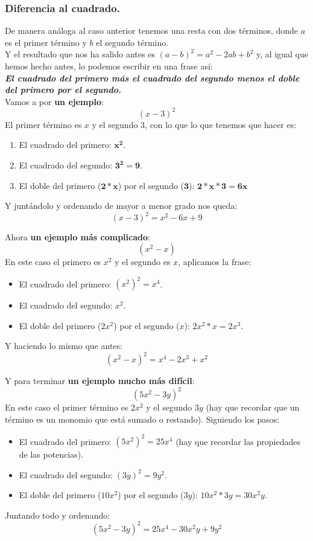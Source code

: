 \documentclass[a4paper,11pt,answers]{exam}
\begin{document}
  \subsubsection{Diferencia al cuadrado.}
  De manera análoga al caso anterior tenemos una resta con dos términos, donde $a$ es el primer término y $b$ el segundo término.\\

  Y el resultado que nos ha salido antes es $(a-b)^2 = a^2 - 2ab + b^2$ y, al igual que hemos hecho antes, lo podemos escribir en una frase así:\\
  \textbf{\emph{El cuadrado del primero más el cuadrado del segundo menos el doble del primero por el segundo.}}\\

  Vamos a por \textbf{un ejemplo}:
  \[(x - 3)^2\]
  El primer término es $x$ y el segundo $3$, con lo que lo que tenemos que hacer es:
  \begin{enumerate}
  \item El cuadrado del primero: $\boldsymbol{x^2}$.
  \item El cuadrado del segundo: $\boldsymbol{3^2 = 9}$.
  \item El doble del primero ($\boldsymbol{2*x}$) por el segundo ($\boldsymbol{3}$): $\boldsymbol{2*x*3 = 6x}$
  \end{enumerate}
  Y juntándolo y ordenando de mayor a menor grado nos queda:
  \[(x-3)^2 = x^2 - 6x + 9\]

  Ahora \textbf{un ejemplo más complicado}:
  \[(x^2 - x)\]
  En este caso el primero es $x^2$ y el segundo es $x$, aplicamos la frase:
  \begin{itemize}
  \item El cuadrado del primero: $\left(x^2\right)^2 = x^4$.
  \item El cuadrado del segundo: $x^2$.
  \item El doble del primero ($2x^2$) por el segundo ($x$): $2x^2*x = 2x^3$.
  \end{itemize}
  Y haciendo lo mismo que antes:
  \[(x^2 - x)^2 = x^4 - 2x^3 + x^2\]

  Y para terminar \textbf{un ejemplo mucho más difícil}:
  \[(5x^2 - 3y)^2\]
  En este caso el primer término es $2x^2$ y el segundo $3y$ (hay que recordar que un término es un monomio que está sumado o restando). Siguiendo los pasos:
  \begin{itemize}
  \item El cuadrado del primero: $\left(5x^2\right)^2 = 25x^4$ (hay que recordar las propiedades de las potencias).
  \item El cuadrado del segundo: $(3y)^2 = 9y^2$.
  \item El doble del primero ($10x^2$) por el segundo ($3y$): $10x^2 * 3y = 30x^2 y$.
  \end{itemize}
  Juntando todo y ordenando:
  \[(5x^2 - 3y)^2 = 25x^4 - 30x^2 y + 9y^2\]
\end{document}
